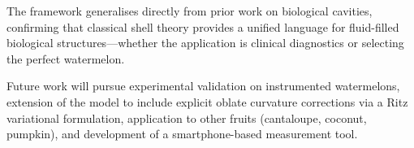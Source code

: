 The framework generalises directly from prior work on biological
cavities, confirming that classical shell theory provides a unified
language for fluid-filled biological structures---whether the application
is clinical diagnostics or selecting the perfect watermelon.

Future work will pursue experimental validation on instrumented
watermelons, extension of the model to include explicit oblate curvature
corrections via a Ritz variational formulation, application to other
fruits (cantaloupe, coconut, pumpkin), and development of a
smartphone-based measurement tool.
